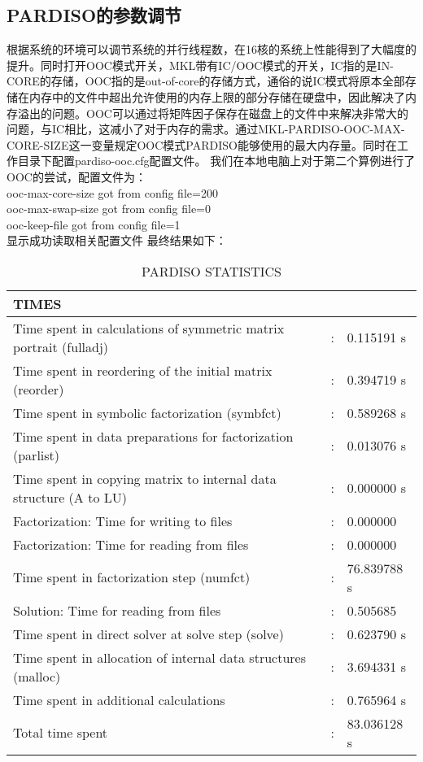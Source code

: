 \documentclass[forprint]{WHUBachelor}
\begin{document}
\subsection{PARDISO的参数调节}
根据系统的环境可以调节系统的并行线程数，在16核的系统上性能得到了大幅度的提升。同时打开OOC模式开关，MKL带有IC/OOC模式的开关，IC指的是IN-CORE的存储，OOC指的是out-of-core的存储方式，通俗的说IC模式将原本全部存储在内存中的文件中超出允许使用的内存上限的部分存储在硬盘中，因此解决了内存溢出的问题。OOC可以通过将矩阵因子保存在磁盘上的文件中来解决非常大的问题，与IC相比，这减小了对于内存的需求。通过MKL-PARDISO-OOC-MAX-CORE-SIZE这一变量规定OOC模式PARDISO能够使用的最大内存量。同时在工作目录下配置pardiso-ooc.cfg配置文件。
我们在本地电脑上对于第二个算例进行了OOC的尝试，配置文件为：\\
ooc-max-core-size got from config file=200 \\
ooc-max-swap-size got from config file=0 \\
ooc-keep-file     got from config file=1 \\
显示成功读取相关配置文件
最终结果如下：
\begin{table}[htbp]
  \centering
  \caption{PARDISO STATISTICS}

    \begin{tabular}{lcl}
   \multicolumn{3}{l}{TIMES} \\
 \hline
Time spent in calculations of symmetric matrix portrait (fulladj)&:& 0.115191 s \\
Time spent in reordering of the initial matrix (reorder)         &:& 0.394719 s \\
Time spent in symbolic factorization (symbfct)                  & :& 0.589268 s \\
Time spent in data preparations for factorization (parlist)     & :& 0.013076 s \\
Time spent in copying matrix to internal data structure (A to LU)&:& 0.000000 s \\
      Factorization: Time for writing to files & :& 0.000000 \\
      Factorization: Time for reading from files&:& 0.000000 \\
Time spent in factorization step (numfct)       &                 : &76.839788 s\\
      Solution:      Time for reading from files&: &0.505685 \\
Time spent in direct solver at solve step (solve)&                : &0.623790 s \\
Time spent in allocation of internal data structures (malloc)&    : &3.694331 s \\
Time spent in additional calculations                        &    : &0.765964 s \\
Total time spent                                             &    : &83.036128 s \\
\hline
    \end{tabular}%
  \label{tab:addlabel}%
\end{table}%
\end{document}
